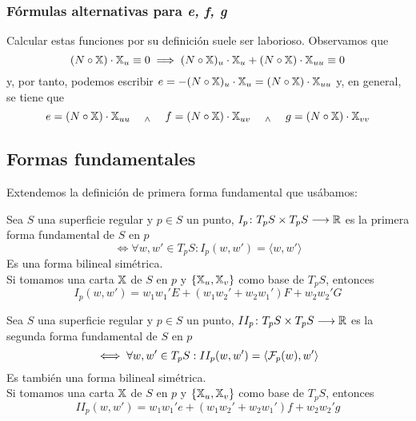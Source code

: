 \subsubsection{Fórmulas alternativas para \textit{e, f, g}}
Calcular estas funciones por su definición suele ser laborioso. Observamos que
\[(N\circ \mathbb{X}) \cdot \mathbb{X}_u \equiv 0 \implies (N\circ \mathbb{X})_u \cdot \mathbb{X}_u + (N\circ \mathbb{X}) \cdot \mathbb{X}_{uu} \equiv 0\]
y, por tanto, podemos escribir $e = - (N\circ \mathbb{X})_u \cdot \mathbb{X}_u =  (N\circ \mathbb{X}) \cdot \mathbb{X}_{uu}$ y, en general, se tiene que
\[e = (N\circ \mathbb{X}) \cdot \mathbb{X}_{uu} \quad\; _{\wedge} \;\quad f = (N\circ \mathbb{X}) \cdot \mathbb{X}_{uv} \quad\; _{\wedge} \;\quad g = (N\circ \mathbb{X}) \cdot \mathbb{X}_{vv}\]

\subsection{Formas fundamentales}
Extendemos la definición de primera forma  fundamental que usábamos:
\begin{defn}
	Sea $S$ una superficie regular y $p \in S$ un punto, $I_p \colon T_pS\times T_pS \longrightarrow \mathbb{R}$ es la primera forma fundamental de $S$ en $p$ \[\iff \forall w, w' \in T_pS : I_p(w, w') = \langle w, w' \rangle\]
	Es una forma bilineal simétrica.\\
	Si tomamos una carta $\mathbb{X}$ de $S$ en $p$ y $\{\mathbb{X}_u, \mathbb{X}_v\}$ como base de $T_pS$, entonces
	\[I_p(w, w') = w_1w_1'E + (w_1w_2' + w_2w_1')F + w_2w_2'G\]
\end{defn}

\begin{defn}
	Sea $S$ una superficie regular y $p \in S$ un punto, $II_p \colon T_pS\times T_pS \longrightarrow \mathbb{R}$ es la segunda forma fundamental de $S$ en $p$ \[\iff \forall w, w' \in T_pS : II_p(w, w') = \langle \mathcal{F}_p(w), w' \rangle\]
	Es también una forma bilineal simétrica.\\
	Si tomamos una carta $\mathbb{X}$ de $S$ en $p$ y $\{\mathbb{X}_u, \mathbb{X}_v\}$ como base de $T_pS$, entonces
	\[II_p(w, w') = w_1w_1'e + (w_1w_2' + w_2w_1')f + w_2w_2'g\]
\end{defn}

